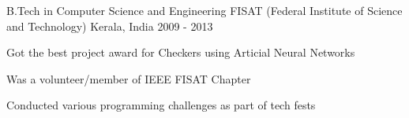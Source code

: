 \begin{cventries}
  \cventry
    {B.Tech in Computer Science and Engineering}
    {FISAT (Federal Institute of Science and Technology)}
    {Kerala, India}
    {2009 - 2013}
    {
      \begin{cvitems}
        \item {Got the best project award for Checkers using Articial Neural Networks}
        \item {Was a volunteer/member of IEEE FISAT Chapter}
        \item {Conducted various programming challenges as part of tech fests}
      \end{cvitems}
    }
\end{cventries}
